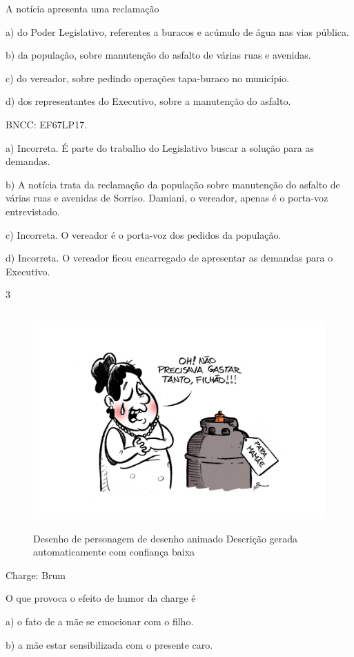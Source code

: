 {A notícia apresenta uma reclamação

a) do Poder Legislativo, referentes a buracos e acúmulo de água nas vias
pública.

b) da população, sobre manutenção do asfalto de várias ruas e avenidas.

c) do vereador, sobre pedindo operações tapa-buraco no município.

d) dos representantes do Executivo, sobre a manutenção do asfalto.

BNCC: EF67LP17.

a) Incorreta. É parte do trabalho do Legislativo buscar a solução para
as demandas.

b) A notícia trata da reclamação da população sobre manutenção do
asfalto de várias ruas e avenidas de Sorriso. Damiani, o vereador,
apenas é o porta-voz entrevistado.

c) Incorreta. O vereador é o porta-voz dos pedidos da população.

d) Incorreta. O vereador ficou encarregado de apresentar as demandas
para o Executivo.

\num{3}

\begin{figure}
\centering
\includegraphics[width=4.86098in,height=3.28333in]{./imgSAEB_6_POR/media/image39.png}
\caption{Desenho de personagem de desenho animado Descrição gerada
automaticamente com confiança baixa}
\end{figure}

Charge: Brum

O que provoca o efeito de humor da charge é

a) o fato de a mãe se emocionar com o filho.

b) a mãe estar sensibilizada com o presente caro.

}
